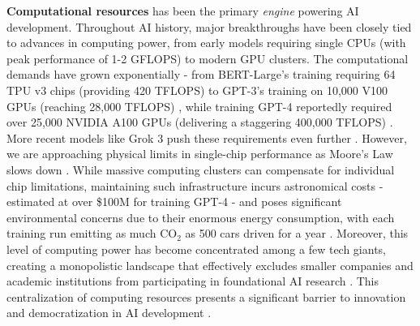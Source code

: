 \textbf{Computational resources} has been the primary \textit{engine} powering AI development. Throughout AI history, major breakthroughs have been closely tied to advances in computing power, from early models requiring single CPUs (with peak performance of 1-2 GFLOPS) to modern GPU clusters. The computational demands have grown exponentially - from BERT-Large's training requiring 64 TPU v3 chips (providing 420 TFLOPS) \citep{devlin2018bert} to GPT-3's training on 10,000 V100 GPUs (reaching 28,000 TFLOPS) \citep{brown2020language}, while training GPT-4 reportedly required over 25,000 NVIDIA A100 GPUs (delivering a staggering 400,000 TFLOPS) \citep{openai2023gpt4}. More recent models like Grok 3 push these requirements even further \citep{xai2025grok3}. However, we are approaching physical limits in single-chip performance as Moore's Law slows down \citep{thompson2021deep}. While massive computing clusters can compensate for individual chip limitations, maintaining such infrastructure incurs astronomical costs - estimated at over \$100M for training GPT-4 \citep{sharir2020cost} - and poses significant environmental concerns due to their enormous energy consumption, with each training run emitting as much CO$_2$ as 500 cars driven for a year \citep{schwartz2020green}. Moreover, this level of computing power has become concentrated among a few tech giants, creating a monopolistic landscape that effectively excludes smaller companies and academic institutions from participating in foundational AI research \citep{hagiu2025artificial}. This centralization of computing resources presents a significant barrier to innovation and democratization in AI development \citep{anderljung2023frontier}.



